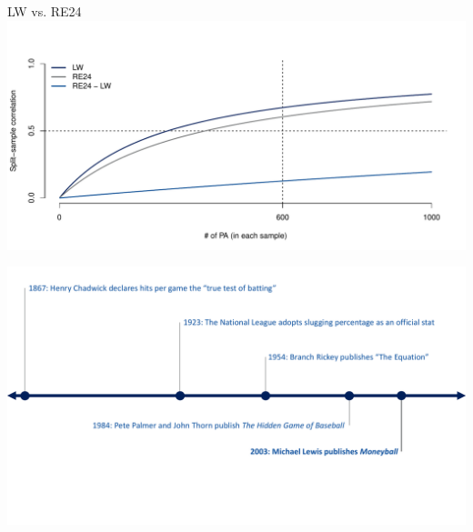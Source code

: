 \documentclass[handout]{beamer}
\begin{document}

\begin{frame}{LW vs. RE24}
  \includegraphics[width = \textwidth]{figures/re24_lw_diff.pdf}
\end{frame}

\begin{frame}
  \includegraphics[width = \textwidth]{figures/timeline_2003.pdf}
\end{frame}
\end{document}
